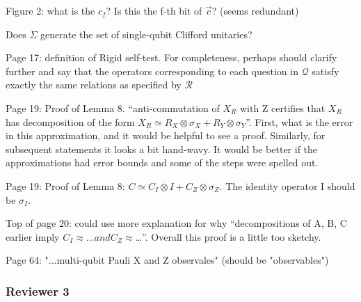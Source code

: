 \documentclass[12pt]{article}
\begin{document}
Figure 2: what is the $c_f$? Is this the f-th bit of $\vec{c}$? (seems redundant)

Does $\Sigma$ generate the set of single-qubit Clifford unitaries?

Page 17: definition of Rigid self-test. For completeness, perhaps should clarify further and say that the operators corresponding to each question in $\mathcal{Q}$ satisfy exactly the same relations as specified by $\mathcal{R}$

Page 19: Proof of Lemma 8. “anti-commutation of $X_R$ with Z certifies that $X_R$ has decomposition of the form $X_R \simeq R_X \otimes \sigma_X + R_Y \otimes \sigma_Y$”. First, what is the error in this approximation, and it would be helpful to see a proof. Similarly, for subsequent statements it looks a bit hand-wavy. It would be better if the approximations had error bounds and some of the steps were spelled out. 

Page 19: Proof of Lemma 8: $C \simeq C_I \otimes I + C_Z \otimes \sigma_Z$. The identity operator I should be $\sigma_I$. 

Top of page 20: could use more explanation for why “decompositions of A, B, C earlier imply $C_I \approx… and C_Z \approx$…”. Overall this proof is a little too sketchy.

Page 64: "...multi-qubit Pauli X and Z observales" (should be "observables")

\subsubsection*{Reviewer 3}
\end{document}
